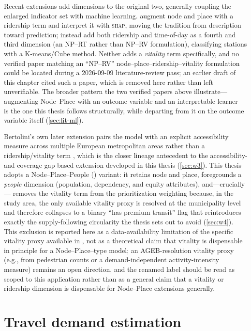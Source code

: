 Recent extensions add dimensions to the original two, generally coupling the enlarged
indicator set with machine learning. \textcite{su2022nodeplace} augment node and place
with a ridership term and interpret it with \textsc{shap}, moving the tradition from
description toward prediction; \textcite{aminipishro2022nprt} instead add both ridership
and time-of-day as a fourth and third dimension (an NP--RT rather than NP--RV
formulation), classifying stations with a K-means/Cube method. Neither adds a
\emph{vitality} term specifically, and no verified paper matching an ``NP--RV''
node--place--ridership--vitality formulation could be located during a 2026-09-09
literature-review pass; an earlier draft of this chapter cited such a paper, which is
removed here rather than left unverifiable. The broader pattern the two verified papers
above illustrate---augmenting Node--Place with an outcome variable and an interpretable
learner---is the one this thesis follows structurally, while departing from it on the
outcome variable itself (\cref{sec:lit-ml}).

Bertolini's own later extension pairs the model with an explicit accessibility measure
across multiple European metropolitan areas rather than a ridership/vitality term
\parencite{papa2015tod}, which is the closer lineage antecedent to the accessibility- and
coverage-gap-based extension developed in this thesis (\cref{sec:w3}). This thesis adopts
a Node--Place--People (\nppv) variant: it retains node and place, foregrounds a
\emph{people} dimension (population, dependency, and equity attributes), and---crucially---
removes the vitality term from the prioritization weighting because, in the study area, the
only available vitality proxy is resolved at the municipality level and therefore collapses
to a binary ``has-premium-transit'' flag that reintroduces exactly the supply-following
circularity the thesis sets out to avoid (\cref{sec:w4}). This exclusion is reported here as
a data-availability limitation of the specific vitality proxy available in \zmg, not as a
theoretical claim that vitality is dispensable in principle for a Node--Place--type model;
an AGEB-resolution vitality proxy (e.g., from pedestrian counts or a demand-independent
activity-intensity measure) remains an open direction, and the renamed \nppv{} label should
be read as scoped to this application rather than as a general claim that a vitality or
ridership dimension is dispensable for Node--Place extensions generally.

\section{Travel demand estimation}
\label{sec:lit-demand}

